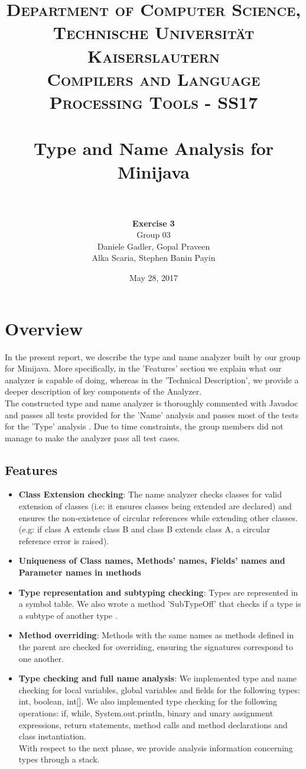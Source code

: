 \documentclass[paper=a4, fontsize=11pt]{scrartcl}
\title{
		\usefont{OT1}{bch}{b}{n}
		\normalfont \normalsize \textsc{Department of Computer Science, Technische Universit\"at Kaiserslautern\\
Compilers and Language Processing Tools - SS17
		} \\ [2pt]
		\horrule{0.5pt} \\[0.4cm]
		\huge Type and Name Analysis for Minijava\\
		\horrule{2pt} \\[0.5cm]
}
\author{	
		\textbf{Exercise 3}\\
		Group 03\\
        Daniele Gadler, Gopal Praveen\\Alka Scaria, Stephen Banin Payin \\[-1pt]		\normalsize
}
\date{May 28, 2017}
\numberwithin{equation}{section}		%
\numberwithin{figure}{section}			%
\numberwithin{table}{section}				%
\begin{document}
\maketitle

\section*{Overview}
In the present report, we describe the type and name analyzer built by our group for Minijava. 
More specifically, in the 'Features' section we explain what our analyzer is capable of doing, whereas in the 'Technical Description', we provide a deeper description of key components of the Analyzer.\\
The constructed type and name analyzer is thoroughly commented with Javadoc and passes all tests provided for the 'Name' analysis and passes most of the tests for the 'Type' analysis . Due to time constraints, the group members did not manage to make the analyzer pass all test cases. 

\subsection*{Features}

\begin{itemize}
 \item \textbf{Class Extension checking}: The name analyzer checks classes for valid extension of classes (i.e: it ensures classes being extended are declared) and ensures the non-existence of circular references while extending other classes. (e.g: if class A extends class B and class B extends class A, a circular reference error is raised). 
 \item \textbf{Uniqueness of Class names, Methods' names, Fields' names and Parameter names in methods }
 \item \textbf{Type representation and subtyping checking}: Types are represented in a symbol table. We also wrote a method 'SubTypeOff' that checks if a type is a subtype of another type \cite{Joseff}.
 \item \textbf{Method overriding}: Methods with the same names as methods defined in the parent are checked for overriding, ensuring the signatures correspond to one another. 
 \item \textbf{Type checking and full name analysis}: We implemented type and name checking for local variables, global variables and fields for the following types: int, boolean, int[]. We also implemented type checking for the following operations: if, while, System.out.println, binary and unary assignment expressions, return statements, method calls and method declarations and class instantiation. \\
With respect to the next phase, we provide analysis information concerning types through a stack.
 
\end{itemize}
\end{document}
